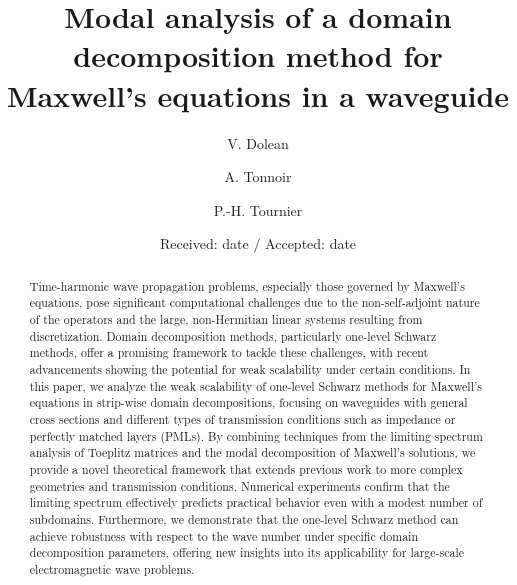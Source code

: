 \documentclass[smallextended]{svjour3}       %
\begin{document}
\title{Modal analysis of a domain decomposition method for Maxwell's equations in a waveguide}


\author{V. Dolean  \and A. Tonnoir \and P.-H. Tournier  
}



\date{Received: date / Accepted: date}

\maketitle

\begin{abstract}
Time-harmonic wave propagation problems, especially those governed by Maxwell’s equations, pose significant computational challenges due to the non-self-adjoint nature of the operators and the large, non-Hermitian linear systems resulting from discretization. Domain decomposition methods, particularly one-level Schwarz methods, offer a promising framework to tackle these challenges, with recent advancements showing the potential for weak scalability under certain conditions. In this paper, we analyze the weak scalability of one-level Schwarz methods for Maxwell’s equations in strip-wise domain decompositions, focusing on waveguides with general cross sections and different types of transmission conditions such as impedance or perfectly matched layers (PMLs). By combining techniques from the limiting spectrum analysis of Toeplitz matrices and the modal decomposition of Maxwell’s solutions, we provide a novel theoretical framework that extends previous work to more complex geometries and transmission conditions. Numerical experiments confirm that the limiting spectrum effectively predicts practical behavior even with a modest number of subdomains. Furthermore, we demonstrate that the one-level Schwarz method can achieve robustness with respect to the wave number under specific domain decomposition parameters, offering new insights into its applicability for large-scale electromagnetic wave problems.

\end{abstract}
\end{document}

